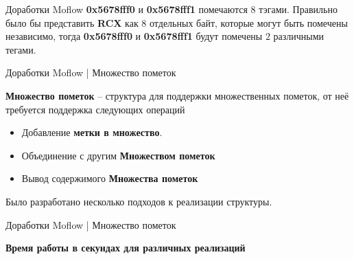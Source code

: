 \documentclass[10pt]{beamer}
\begin{document}
\begin{frame}[fragile]{Доработки Moflow}
    \textbf{0x5678fff0} и \textbf{0x5678fff1} помечаются $8$ тэгами. Правильно было бы представить \textbf{RCX} как 8 отдельных байт, которые могут быть помечены независимо, тогда \textbf{0x5678fff0} и \textbf{0x5678fff1} будут помечены $2$ различными тегами.

\end{frame}


\begin{frame}{Доработки Moflow | Множество пометок}
    
    \textbf{Множество пометок} -- структура для поддержки множественных пометок, от неё требуется поддержка следующих операций
    \begin{itemize}
        \item Добавление \textbf{метки в множество}.
        \item Объединение с другим \textbf{Множеством пометок}
        \item Вывод содержимого \textbf{Множества пометок}
     \end{itemize}
     \pause
     Было разработано несколько подходов к реализации структуры.

\end{frame}

\begin{frame}{Доработки Moflow | Множество пометок}

    \textbf{Время работы в секундах для различных реализаций}\\
\end{frame}
\end{document}
